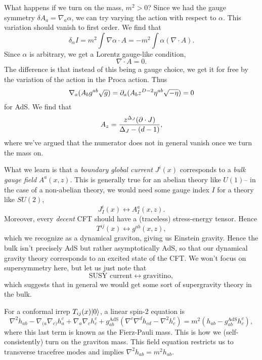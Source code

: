 What happens if we turn on the mass, $m^2>0$? Since we had the gauge symmetry $\delta A_a = \nabla_a \alpha$, we can try varying the action with respect to $\alpha$. This variation should vanish to first order. We find that
\begin{equation}
    \delta_\alpha I = m^2 \int \nabla \alpha \cdot A = -m^2 \int \alpha (\nabla \cdot A).
\end{equation}
Since $\alpha$ is arbitrary, we get a Lorentz gauge-like condition,
\begin{equation}
    \nabla \cdot A = 0.
\end{equation}
The difference is that instead of this being a gauge choice, we get it for free by the variation of the action in the Proca action. Thus
\begin{equation}
    \nabla_a (A_b g^{ab} \sqrt{g}) = \partial_a (A_b z^{D-2} \eta^{ab} \sqrt{-\eta})=0
\end{equation}
for AdS. We find that
\begin{equation}
    A_z = \frac{z^{\Delta_J} (\partial \cdot J)}{\Delta_J - (d-1)},
\end{equation}
where we've argued that the numerator does not in general vanish once we turn the mass on.

What we learn is that a \emph{boundary global current} $J^i(x)$ corresponds to a \emph{bulk gauge field} $A^a(x,z)$. This is generally true for an abelian theory like $U(1)$-- in the case of a non-abelian theory, we would need some gauge index $I$ for a theory like $SU(2)$,
\begin{equation}
    J^i_I(x) \leftrightarrow A_I^a (x,z).
\end{equation}
Moreover, every \emph{decent} CFT should have a (traceless) stress-energy tensor. Hence
\begin{equation}
     T^{ij}(x) \leftrightarrow g^{ab}(x,z),
\end{equation}
which we recognize as a dynamical graviton, giving us Einstein gravity. Hence the bulk isn't precisely AdS but rather asymptotically AdS, so that our dynamical gravity theory corresponds to an excited state of the CFT. We won't focus on supersymmetry here, but let us just note that
\begin{equation}
    \text{SUSY current} \leftrightarrow \text{gravitino},
\end{equation}
which suggests that in general we would get some sort of supergravity theory in the bulk.

For a conformal irrep $T_{ij}(x)\lvert0\rangle$, a linear spin-2 equation is
\begin{equation}
    \nabla^2 h_{ab} - \nabla_{(a}\nabla_{c)} h_a^c + \nabla_a \nabla_c h^c_c + g_{ab}^\text{AdS} (\nabla^c \nabla^d h_{cd} -\nabla^2 h^c_c) = m^2(h_{ab} -g_{ab}^\text{AdS}h_c^c),
\end{equation}
where this last term is known as the Fierz-Pauli mass. This is how we (self-consistently) turn on the graviton mass. This field equation restricts us to transverse tracefree modes and implies $\nabla^2 h_{ab} =m^2h_{ab}$. 

